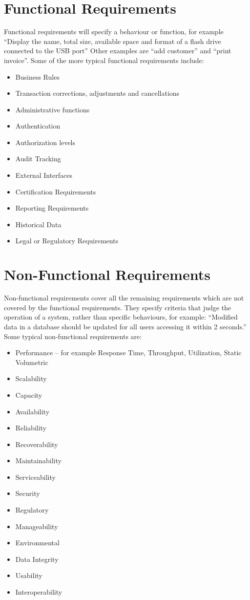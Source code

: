 \documentclass[11pt]{report}
\begin{document}
\section{Functional Requirements}
    Functional requirements will specify a behaviour or function, for example ``Display the name, total size, available space and format of a flash drive connected to the USB port'' Other examples are ``add customer'' and ``print invoice''. Some of the more typical functional requirements include:
    \begin{itemize}
        \item Business Rules
        \item Transaction corrections, adjustments and cancellations
        \item Administrative functions
        \item Authentication
        \item Authorization levels
        \item Audit Tracking
        \item External Interfaces
        \item Certification Requirements
        \item Reporting Requirements
        \item Historical Data
        \item Legal or Regulatory Requirements
    \end{itemize}

\section{Non-Functional Requirements}
    Non-functional requirements cover all the remaining requirements which are not covered by the functional requirements. They specify criteria that judge the operation of a system, rather than specific behaviours, for example: ``Modified data in a database should be updated for all users accessing it within 2 seconds.'' Some typical non-functional requirements are:
    \begin{itemize}
        \item Performance – for example Response Time, Throughput, Utilization, Static Volumetric
        \item Scalability
        \item Capacity
        \item Availability
        \item Reliability
        \item Recoverability
        \item Maintainability
        \item Serviceability
        \item Security
        \item Regulatory
        \item Manageability
        \item Environmental
        \item Data Integrity
        \item Usability
        \item Interoperability
    \end{itemize}
\end{document}
